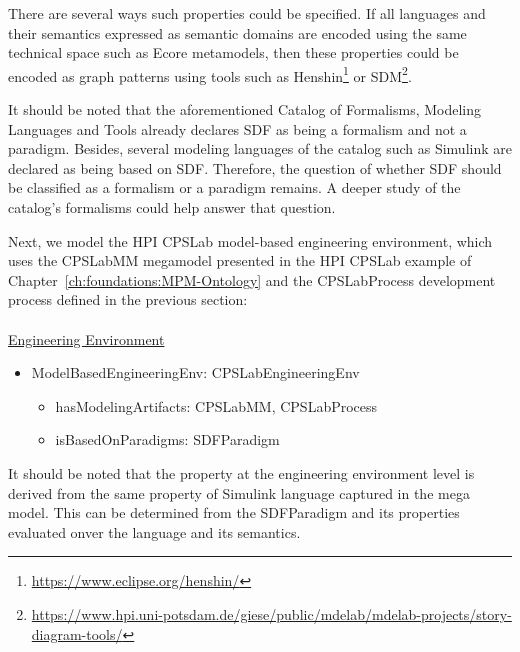 There are several ways such properties could be specified. If all languages and their semantics expressed as semantic domains are encoded using the same technical space such as Ecore metamodels, then these properties could be encoded as graph patterns using tools such as Henshin\footnote{\url{https://www.eclipse.org/henshin/}} or SDM\footnote{\url{https://www.hpi.uni-potsdam.de/giese/public/mdelab/mdelab-projects/story-diagram-tools/}}.

It should be noted that the aforementioned Catalog of Formalisms, Modeling Languages and Tools already declares SDF as being a formalism and not a paradigm. Besides, several modeling languages of the catalog such as Simulink are declared as being based on SDF. Therefore, the question of whether SDF should be classified as a formalism or a paradigm remains. A deeper study of the catalog's formalisms could help answer that question.

Next, we model the HPI CPSLab model-based engineering environment, which uses the CPSLabMM megamodel presented in the HPI CPSLab example of Chapter~\ref{ch:foundations:MPM-Ontology} and the CPSLabProcess development process defined in the previous section:
\\
\\
\noindent\uline{Engineering Environment}
\begin{itemize}
\item ModelBasedEngineeringEnv: CPSLabEngineeringEnv
    \begin{itemize}
        \item hasModelingArtifacts: CPSLabMM, CPSLabProcess
        \item isBasedOnParadigms: SDFParadigm
    \end{itemize}
\end{itemize}

It should be noted that the  property at the engineering environment level is derived from the same property of Simulink language captured in the mega model. This can be determined from the SDFParadigm and its properties evaluated onver the language and its semantics.




